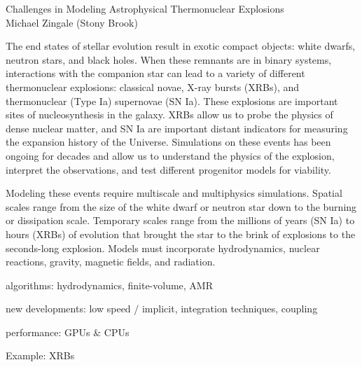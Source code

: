 \documentclass[11pt]{article}
\begin{document}
\begin{center}
{\Large Challenges in Modeling Astrophysical Thermonuclear Explosions} \\[0.25em]
Michael Zingale (Stony Brook)
\end{center}

The end states of stellar evolution result in exotic compact objects:
white dwarfs, neutron stars, and black holes.  When these remnants are
in binary systems, interactions with the companion star can lead to a
variety of different thermonuclear explosions: classical novae, X-ray
bursts (XRBs), and thermonuclear (Type Ia) supernovae (SN Ia).  These
explosions are important sites of nucleosynthesis in the galaxy.  XRBs
allow us to probe the physics of dense nuclear matter, and SN Ia are
important distant indicators for measuring the expansion history of
the Universe.  Simulations on these events has been ongoing for
decades and allow us to understand the physics of the explosion,
interpret the observations, and test different progenitor models for
viability.

Modeling these events require multiscale and multiphysics simulations.
Spatial scales range from the size of the white dwarf or neutron star
down to the burning or dissipation scale.  Temporary scales range from
the millions of years (SN Ia) to hours (XRBs) of evolution that
brought the star to the brink of explosions to the seconds-long
explosion.  Models must incorporate hydrodynamics, nuclear reactions,
gravity, magnetic fields, and radiation.

algorithms: hydrodynamics, finite-volume, AMR

new developments: low speed / implicit, integration techniques, coupling

performance: GPUs \& CPUs

Example: XRBs
\end{document}
